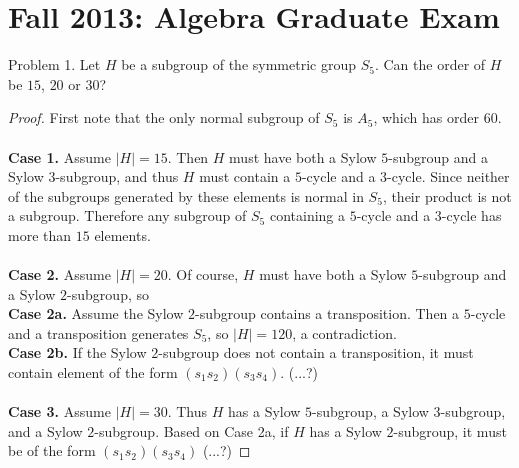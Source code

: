 \documentclass{article}
\begin{document}
\section{Fall 2013: Algebra Graduate Exam}
\begin{subsection}{Problem 1.}
  Let $H$ be a subgroup of the symmetric group $S_5$. Can the order of $H$ be
  $15$, $20$ or $30$?
\end{subsection}

\begin{proof}
  First note that the only normal subgroup of $S_5$ is $A_5$, which has order
  $60$.
  \\~\\
  \textbf{Case 1.} Assume $|H| = 15$.
  Then $H$ must have both a Sylow $5$-subgroup and a Sylow
  $3$-subgroup, and thus $H$ must contain a $5$-cycle and a $3$-cycle.
  Since neither of the subgroups generated by these elements is normal in $S_5$,
  their product is not a subgroup.
  Therefore any subgroup of $S_5$ containing a $5$-cycle and a $3$-cycle has
  more than $15$ elements.
  \\~\\
  \textbf{Case 2.} Assume $|H| = 20$.
  Of course, $H$ must have both a Sylow $5$-subgroup and a Sylow $2$-subgroup,
  so
  \\
  \indent\textbf{Case 2a.} Assume the Sylow $2$-subgroup contains a
  transposition. Then a $5$-cycle and a transposition generates $S_5$,
  so $|H| = 120$, a contradiction.
  \\
  \indent\textbf{Case 2b.} If the Sylow $2$-subgroup does not contain a
  transposition, it must contain element of the form $(s_1s_2)(s_3s_4)$. (...?)
  \\~\\
  \textbf{Case 3.}
  Assume $|H| = 30$. Thus $H$ has a Sylow $5$-subgroup, a Sylow $3$-subgroup, and a Sylow $2$-subgroup.
  Based on Case 2a, if $H$ has a Sylow $2$-subgroup, it must be of the form $(s_1s_2)(s_3s_4)$ (...?)


\end{proof}
\pagebreak
\end{document}
